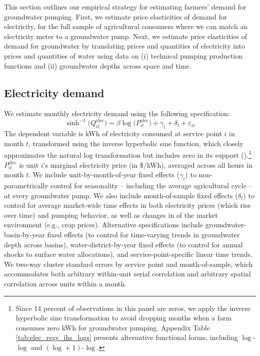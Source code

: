 %
%
This section outlines our empirical strategy for estimating farmers' demand for groundwater pumping. First, we estimate price elasticities of demand for electricity, for the full sample of agricultural consumers where we can match an electricity meter to a groundwater pump. Next, we estimate price elasticities of demand for groundwater by translating prices and quantities of electricity into prices and quantities of water using data on (i) technical pumping production functions and (ii) groundwater depths across space and time.

\subsection{Electricity demand}
\label{sec:empirics_elec}

We estimate monthly electricity demand using the following specification:
\begin{equation}
\sinh^{-1}\big(Q^{\text{elec}}_{it}\big) = \beta \log\big(P^{\text{elec}}_{it}\big) + \gamma_{i} + \delta_t + \varepsilon_{it}
\label{eq:reg_elec}
\end{equation}
The dependent variable is kWh of electricity consumed at service point $i$ in month $t$, transformed using the inverse hyperbolic sine function, which closely approximates the natural log transformation but includes zero in its support (\textcite{bellemare2020}).\footnote{
Since 14 percent of observations in this panel are zeros, we apply the inverse hyperbolic sine transformation to avoid dropping months when a farm consumes zero kWh for groundwater pumping. Appendix Table \ref{tab:elec_regs_ihs_logs} presents alternative functional forms, including $\log$-$\log$ and $(\log+1)$-$\log$.
}
$P^{\text{elec}}_{it}$ is unit $i$'s marginal electricity price (in \$/kWh), averaged across all hours in month $t$. We include unit-by-month-of-year fixed effects ($\gamma_i$) to non-parametrically control for seasonality -- including the average agricultural cycle -- at every groundwater pump. We also include month-of-sample fixed effects ($\delta_t$) to control for average market-wide time effects in both electricity prices (which rise over time) and pumping behavior, as well as changes in of the market environment (e.g., crop prices). Alternative specifications include groundwater-basin-by-year fixed effects (to control for time-varying trends in groundwater depth across basins), water-district-by-year fixed effects (to control for annual shocks to surface water allocations), and service-point-specific linear time trends.
We two-way cluster standard errors by service point and month-of-sample, which accommodates both arbitrary within-unit serial correlation and arbitrary spatial correlation across units within a month.

